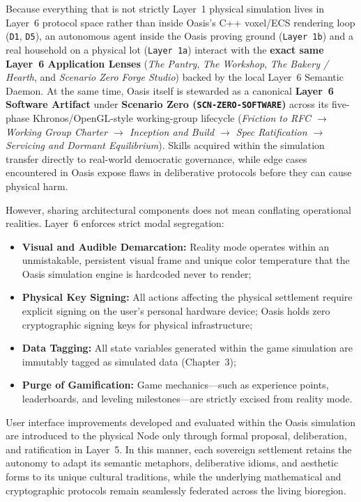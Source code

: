 Because everything that is not strictly Layer~1 physical simulation lives in Layer~6 protocol space rather than inside Oasis's C++ voxel/ECS rendering loop (\texttt{D1}, \texttt{D5}), an autonomous agent inside the Oasis proving ground (\texttt{Layer 1b}) and a real household on a physical lot (\texttt{Layer 1a}) interact with the \textbf{exact same Layer~6 Application Lenses} (\textit{The Pantry}, \textit{The Workshop}, \textit{The Bakery / Hearth}, and \textit{Scenario Zero Forge Studio}) backed by the local Layer~6 Semantic Daemon. At the same time, Oasis itself is stewarded as a canonical \textbf{Layer~6 Software Artifact} under \textbf{Scenario Zero (\texttt{SCN-ZERO-SOFTWARE})} across its five-phase Khronos/OpenGL-style working-group lifecycle (\textit{Friction to RFC $\to$ Working Group Charter $\to$ Inception and Build $\to$ Spec Ratification $\to$ Servicing and Dormant Equilibrium}). Skills acquired within the simulation transfer directly to real-world democratic governance, while edge cases encountered in Oasis expose flaws in deliberative protocols before they can cause physical harm.

However, sharing architectural components does not mean conflating operational realities. Layer~6 enforces strict modal segregation:
\begin{itemize}
  \item \textbf{Visual and Audible Demarcation:} Reality mode operates within an unmistakable, persistent visual frame and unique color temperature that the Oasis simulation engine is hardcoded never to render;
  \item \textbf{Physical Key Signing:} All actions affecting the physical settlement require explicit signing on the user's personal hardware device; Oasis holds zero cryptographic signing keys for physical infrastructure;
  \item \textbf{Data Tagging:} All state variables generated within the game simulation are immutably tagged as simulated data (Chapter~3);
  \item \textbf{Purge of Gamification:} Game mechanics---such as experience points, leaderboards, and leveling milestones---are strictly excised from reality mode.
\end{itemize}

User interface improvements developed and evaluated within the Oasis simulation are introduced to the physical Node only through formal proposal, deliberation, and ratification in Layer~5. In this manner, each sovereign settlement retains the autonomy to adapt its semantic metaphors, deliberative idioms, and aesthetic forms to its unique cultural traditions, while the underlying mathematical and cryptographic protocols remain seamlessly federated across the living bioregion.
